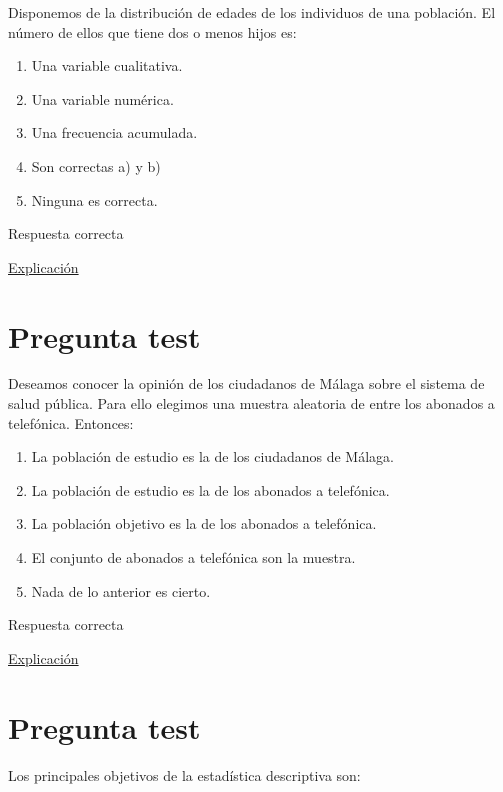 \documentclass[
]{book}
\providecommand{\tightlist}{%
  \setlength{\itemsep}{0pt}\setlength{\parskip}{0pt}}
\begin{document}
Disponemos de la distribución de edades de los individuos de una población. El número de ellos que tiene dos o menos hijos es:

\begin{enumerate}
\def\labelenumi{\alph{enumi})}
\tightlist
\item
  Una variable cualitativa.
\item
  Una variable numérica.
\item
  Una frecuencia acumulada.
\item
  Son correctas a) y b)
\item
  Ninguna es correcta.
\end{enumerate}

Respuesta correcta

\href{https://1fjmanzano.github.io/bioestadistica/tablas-de-frecuencias.html}{Explicación}

\hypertarget{pregunta-test-36}{%
\section{Pregunta test}\label{pregunta-test-36}}

Deseamos conocer la opinión de los ciudadanos de Málaga sobre el sistema de salud pública. Para ello elegimos una muestra aleatoria de entre los abonados a telefónica. Entonces:

\begin{enumerate}
\def\labelenumi{\alph{enumi})}
\tightlist
\item
  La población de estudio es la de los ciudadanos de Málaga.
\item
  La población de estudio es la de los abonados a telefónica.
\item
  La población objetivo es la de los abonados a telefónica.
\item
  El conjunto de abonados a telefónica son la muestra.
\item
  Nada de lo anterior es cierto.
\end{enumerate}

Respuesta correcta

\href{https://1fjmanzano.github.io/bioestadistica/conceptos-previos.html}{Explicación}

\hypertarget{pregunta-test-37}{%
\section{Pregunta test}\label{pregunta-test-37}}

Los principales objetivos de la estadística descriptiva son:
\end{document}
